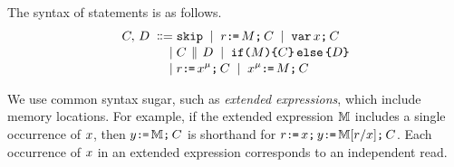\begin{comment}
\footnote{We only consider executions where register state is empty in
  forked threads.  Given item~\ref{pre-acquire} of
  Definition~\ref{def:prefix}, a sufficient condition is that parallel
  composition is always preceded by an acquire fence, as in programs of the
  form:
  \begin{displaymath}
    \VAR\vec{\aLoc}\SEMI
    \vec{\aLoc}\GETS\vec{0}\SEMI
    \vec{\bLoc}\GETS\vec{0}\SEMI
    \FENCE\SEMI
    (\aCmd^1 \PAR \cdots \PAR \aCmd^n)
  \end{displaymath}
  where $\aCmd^1$, \ldots, $\aCmd^n$ do not include $\PAR$.  To avoid clutter
  in drawings, we often drop the explicit fence.}.
\end{comment}


The syntax of statements is as follows.
\begin{align*}
C,\,D
\;\mathrel{\mathord{\vcentcolon}\mkern-1mu\mathord{\vcentcolon}\mathord{{=}}}\;& \texttt{skip}
\;\mathrel{|}\; r\texttt{:}\mkern-1mu\texttt{=}\,M\texttt{;}\,\allowbreak C
\;\mathrel{|}\; \texttt{var}\,x\texttt{;}\,\allowbreak C
\\[-.5ex]
\;\mathrel{|}\;&C \,\mathbin{\|}\, D
\;\mathrel{|}\; \texttt{if}\allowbreak\texttt{(}M\texttt{)} \allowbreak\texttt{\{} C \texttt{\}}\,\allowbreak\texttt{else}\allowbreak\,\texttt{\{} D \texttt{\}}
\\[-.5ex]
\;\mathrel{|}\;& r\texttt{:}\mkern-1mu\texttt{=}\,x^{\mu}\texttt{;}\,\allowbreak C 
\;\mathrel{|}\; x^{\mu}\texttt{:}\mkern-1mu\texttt{=}\,M\texttt{;}\,\allowbreak C
\end{align*}



We use common syntax sugar, such as \emph{extended expressions}, which include
memory locations.  For example, if the extended expression $\mathbb{M}$ includes
a single occurrence of $x$, then $y\texttt{:}\mkern-1mu\texttt{=}\,\mathbb{M}\texttt{;}\,\allowbreak C$ is
shorthand for $r\texttt{:}\mkern-1mu\texttt{=}\,x\texttt{;}\,\allowbreak y\texttt{:}\mkern-1mu\texttt{=}\,\mathbb{M}[r/x]\texttt{;}\,\allowbreak C$.
Each occurrence of $x$ in an extended expression corresponds to an
independent read.

